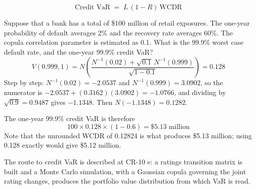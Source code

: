 
\begin{crfmlbox}
\[ \text{Credit VaR} \;=\; L\,(1-R)\,\mathrm{WCDR} \]
\end{crfmlbox}

\begin{crexbox}
Suppose that a bank has a total of \$100 million of retail exposures. The one-year
probability of default averages 2\% and the recovery rate averages 60\%. The
copula correlation parameter is estimated as 0.1. What is the 99.9\% worst case
default rate, and the one-year 99.9\% credit VaR?
\tcblower
\[ V(0.999, 1) = N\!\left(\frac{N^{-1}(0.02) + \sqrt{0.1}\,N^{-1}(0.999)}
   {\sqrt{1-0.1}}\right) = 0.128 \]
Step by step: $N^{-1}(0.02) = -2.0537$ and $N^{-1}(0.999) = 3.0902$, so the
numerator is $-2.0537 + (0.3162)(3.0902) = -1.0766$, and dividing by
$\sqrt{0.9} = 0.9487$ gives $-1.1348$. Then $N(-1.1348) = 0.1282$.

\smallskip
The one-year 99.9\% credit VaR is therefore
\[ 100 \times 0.128 \times (1 - 0.6) = \$5.13 \text{ million} \]
Note that the unrounded WCDR of 0.12824 is what produces \$5.13 million; using
0.128 exactly would give \$5.12 million.
\end{crexbox}

The  route to credit VaR is described at CR-10 e: a ratings
transition matrix is built and a Monte Carlo simulation, with a Gaussian copula
governing the joint rating changes, produces the portfolio value distribution
from which VaR is read.

